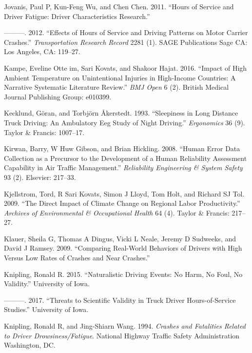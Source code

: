 \documentclass[12pt]{book}
\numberwithin{equation}{chapter}
\begin{document}
\leavevmode\hypertarget{ref-jovanis2011hours}{}%
Jovanis, Paul P, Kun-Feng Wu, and Chen Chen. 2011. ``Hours of Service and Driver Fatigue: Driver Characteristics Research.''

\leavevmode\hypertarget{ref-jovanis2012effects}{}%
---------. 2012. ``Effects of Hours of Service and Driving Patterns on Motor Carrier Crashes.'' \emph{Transportation Research Record} 2281 (1). SAGE Publications Sage CA: Los Angeles, CA: 119--27.

\leavevmode\hypertarget{ref-im2016impact}{}%
Kampe, Eveline Otte im, Sari Kovats, and Shakoor Hajat. 2016. ``Impact of High Ambient Temperature on Unintentional Injuries in High-Income Countries: A Narrative Systematic Literature Review.'' \emph{BMJ Open} 6 (2). British Medical Journal Publishing Group: e010399.

\leavevmode\hypertarget{ref-kecklund1993sleepiness}{}%
Kecklund, Göran, and Torbjörn Åkerstedt. 1993. ``Sleepiness in Long Distance Truck Driving: An Ambulatory Eeg Study of Night Driving.'' \emph{Ergonomics} 36 (9). Taylor \& Francis: 1007--17.

\leavevmode\hypertarget{ref-kirwan2008human}{}%
Kirwan, Barry, W Huw Gibson, and Brian Hickling. 2008. ``Human Error Data Collection as a Precursor to the Development of a Human Reliability Assessment Capability in Air Traffic Management.'' \emph{Reliability Engineering \& System Safety} 93 (2). Elsevier: 217--33.

\leavevmode\hypertarget{ref-kjellstrom2009direct}{}%
Kjellstrom, Tord, R Sari Kovats, Simon J Lloyd, Tom Holt, and Richard SJ Tol. 2009. ``The Direct Impact of Climate Change on Regional Labor Productivity.'' \emph{Archives of Environmental \& Occupational Health} 64 (4). Taylor \& Francis: 217--27.

\leavevmode\hypertarget{ref-klauer2009comparing}{}%
Klauer, Sheila G, Thomas A Dingus, Vicki L Neale, Jeremy D Sudweeks, and David J Ramsey. 2009. ``Comparing Real-World Behaviors of Drivers with High Versus Low Rates of Crashes and Near Crashes.''

\leavevmode\hypertarget{ref-knipling2015naturalistic}{}%
Knipling, Ronald R. 2015. ``Naturalistic Driving Events: No Harm, No Foul, No Validity.'' University of Iowa.

\leavevmode\hypertarget{ref-knipling2017threats}{}%
---------. 2017. ``Threats to Scientific Validity in Truck Driver Hours-of-Service Studies.'' University of Iowa.

\leavevmode\hypertarget{ref-knipling1994crashes}{}%
Knipling, Ronald R, and Jing-Shiarn Wang. 1994. \emph{Crashes and Fatalities Related to Driver Drowsiness/Fatigue}. National Highway Traffic Safety Administration Washington, DC.
\end{document}
